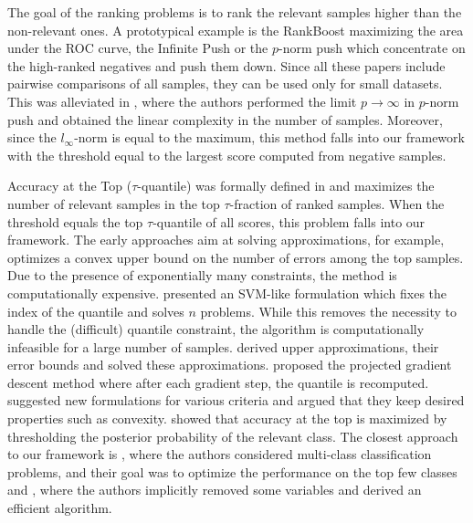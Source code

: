 \documentclass[]{interact}
\theoremstyle{plain}%
\theoremstyle{definition}
\theoremstyle{remark}
\begin{document}
The goal of the ranking problems is to rank the relevant samples higher than the non-relevant ones. A prototypical example is the RankBoost \citep{freund2003efficient} maximizing the area under the ROC curve, the Infinite Push \citep{agarwal2011infinite} or the $p$-norm push \citep{rudin.2009} which concentrate on the high-ranked negatives and push them down. Since all these papers include pairwise comparisons of all samples, they can be used only for small datasets. This was alleviated in \cite{Li_TopPush}, where the authors performed the limit $p\to\infty$ in $p$-norm push and obtained the linear complexity in the number of samples. Moreover, since the $l_{\infty}$-norm is equal to the maximum, this method falls into our framework with the threshold equal to the largest score computed from negative samples.

Accuracy at the Top ($\tau$-quantile) was formally defined in \cite{boyd2012accuracy} and maximizes the number of relevant samples in the top $\tau$-fraction of ranked samples. When the threshold equals the top $\tau$-quantile of all scores, this problem falls into our framework. The early approaches aim at solving approximations, for example, \cite{Joachims:2005:SVM:1102351.1102399} optimizes a convex upper bound on the number of errors among the top samples. Due to the presence of exponentially many constraints, the method is computationally expensive. \cite{boyd2012accuracy} presented an SVM-like formulation which fixes the index of the quantile and solves $n$ problems. While this removes the necessity to handle the (difficult) quantile constraint, the algorithm is computationally infeasible for a large number of samples. \cite{kar2015surrogate} derived upper approximations, their error bounds and solved these approximations. \cite{Grill_2016} proposed the projected gradient descent method where after each gradient step, the quantile is recomputed. \cite{Eban_2017} suggested new formulations for various criteria and argued that they keep desired properties such as convexity. %
\cite{tasche2018plug} showed that accuracy at the top is maximized by thresholding the posterior probability of the relevant class. The closest approach to our framework is \cite{lapin.2015,lapin2018analysis}, where the authors considered multi-class classification problems, and their goal was to optimize the performance on the top few classes and \cite{mackey2018constrained}, where the authors implicitly removed some variables and derived an efficient algorithm.
\end{document}

